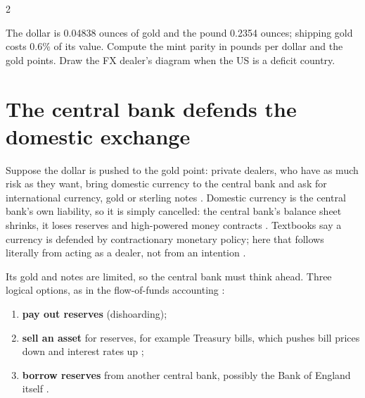 \begin{paracol}{2}
\begin{exercise}
The dollar is 0.04838 ounces of gold and the pound 0.2354 ounces; shipping gold costs 0.6\% of its value. Compute the mint parity in pounds per dollar and the gold
points. Draw the FX dealer's diagram when the US is a deficit country.
\end{exercise}

\section{The central bank defends the domestic exchange}\label{sec:gl-defense}

Suppose the dollar is pushed to the gold point: private dealers, who have as much risk as they want, bring domestic currency to the central bank and ask for
international currency, gold or sterling notes . Domestic currency is the central bank's own liability, so it is
simply cancelled: the central bank's balance sheet shrinks, it loses reserves and high-powered money contracts .
Textbooks say a currency is defended by contractionary monetary policy; here that follows literally from acting as a dealer, not from an intention
.

Its gold and notes are limited, so the central bank must think ahead. Three logical options, as in the flow-of-funds accounting
:
\begin{enumerate}
  \item \textbf{pay out reserves} (dishoarding);
  \item \textbf{sell an asset} for reserves, for example Treasury bills, which pushes bill prices down and interest rates up ;
  \item \textbf{borrow reserves} from another central bank, possibly the Bank of England itself .
\end{enumerate}

\begin{nfigure}
\begin{taccts}
\end{taccts}
\caption{Defending the domestic exchange at the gold point .}\label{fig:gl-cbdefense}
\end{nfigure}


\end{paracol}
